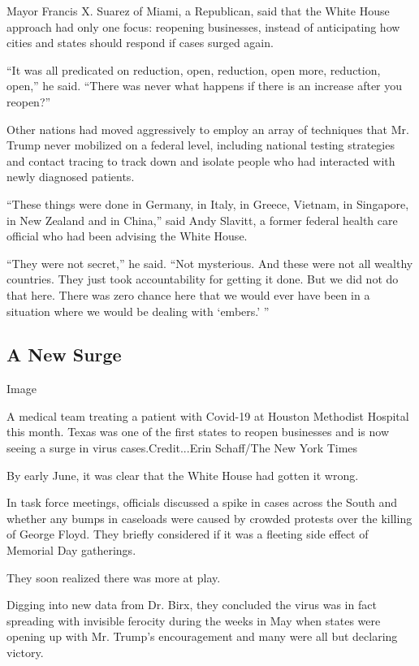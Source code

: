 Mayor Francis X. Suarez of Miami, a Republican, said that the White
House approach had only one focus: reopening businesses, instead of
anticipating how cities and states should respond if cases surged again.

``It was all predicated on reduction, open, reduction, open more,
reduction, open,'' he said. ``There was never what happens if there is
an increase after you reopen?''

Other nations had moved aggressively to employ an array of techniques
that Mr. Trump never mobilized on a federal level, including national
testing strategies and contact tracing to track down and isolate people
who had interacted with newly diagnosed patients.

``These things were done in Germany, in Italy, in Greece, Vietnam, in
Singapore, in New Zealand and in China,'' said Andy Slavitt, a former
federal health care official who had been advising the White House.

``They were not secret,'' he said. ``Not mysterious. And these were not
all wealthy countries. They just took accountability for getting it
done. But we did not do that here. There was zero chance here that we
would ever have been in a situation where we would be dealing with
`embers.' ''

\hypertarget{a-new-surge}{%
\subsection{A New Surge}\label{a-new-surge}}

Image

A medical team treating a patient with Covid-19 at Houston Methodist
Hospital this month. Texas was one of the first states to reopen
businesses and is now seeing a surge in virus cases.Credit...Erin
Schaff/The New York Times

By early June, it was clear that the White House had gotten it wrong.

In task force meetings, officials discussed a spike in cases across the
South and whether any bumps in caseloads were caused by crowded protests
over the killing of George Floyd. They briefly considered if it was a
fleeting side effect of Memorial Day gatherings.

They soon realized there was more at play.

Digging into new data from Dr. Birx, they concluded the virus was in
fact spreading with invisible ferocity during the weeks in May when
states were opening up with Mr. Trump's encouragement and many were all
but declaring victory.

